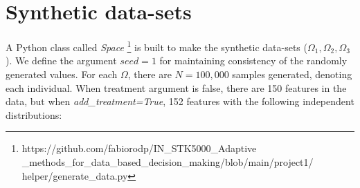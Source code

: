 \section{Synthetic data-sets}
\label{sec:synthetic_data}

A Python class called \textit{Space} \footnote{https://github.com/fabiorodp/IN\_STK5000\_Adaptive \_methods\_for\_data\_based\_decision\_making/blob/main/project1/ helper/generate\_data.py} is built to make the synthetic data-sets ($\Omega_1, \Omega_2, \Omega_3$). We define the argument $seed=1$ for maintaining consistency of the randomly generated values. For each $\Omega$, there are $N=100,000$ samples generated, denoting each individual. When treatment argument is false, there are 150 features in the data, but when \textit{add\_treatment=True}, 152 features with the following independent distributions:
